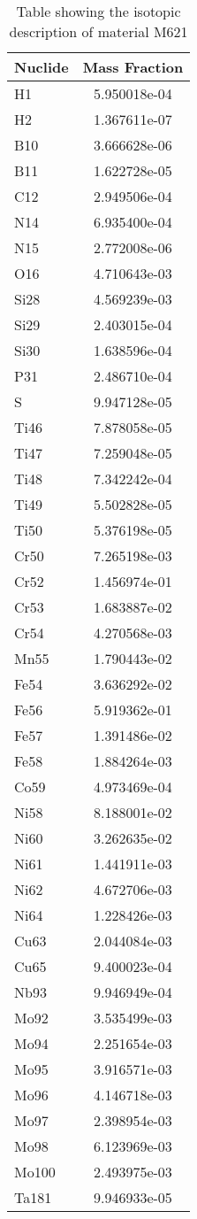 \begin{centering}
\begin{table}[ht!]
\begin{tabular}{l | c}
\hline
Nuclide & Mass Fraction\\
\hline
H1 & 5.950018e-04\\
H2 & 1.367611e-07\\
B10 & 3.666628e-06\\
B11 & 1.622728e-05\\
C12 & 2.949506e-04\\
N14 & 6.935400e-04\\
N15 & 2.772008e-06\\
O16 & 4.710643e-03\\
Si28 & 4.569239e-03\\
Si29 & 2.403015e-04\\
Si30 & 1.638596e-04\\
P31 & 2.486710e-04\\
S & 9.947128e-05\\
Ti46 & 7.878058e-05\\
Ti47 & 7.259048e-05\\
Ti48 & 7.342242e-04\\
Ti49 & 5.502828e-05\\
Ti50 & 5.376198e-05\\
Cr50 & 7.265198e-03\\
Cr52 & 1.456974e-01\\
Cr53 & 1.683887e-02\\
Cr54 & 4.270568e-03\\
Mn55 & 1.790443e-02\\
Fe54 & 3.636292e-02\\
Fe56 & 5.919362e-01\\
Fe57 & 1.391486e-02\\
Fe58 & 1.884264e-03\\
Co59 & 4.973469e-04\\
Ni58 & 8.188001e-02\\
Ni60 & 3.262635e-02\\
Ni61 & 1.441911e-03\\
Ni62 & 4.672706e-03\\
Ni64 & 1.228426e-03\\
Cu63 & 2.044084e-03\\
Cu65 & 9.400023e-04\\
Nb93 & 9.946949e-04\\
Mo92 & 3.535499e-03\\
Mo94 & 2.251654e-03\\
Mo95 & 3.916571e-03\\
Mo96 & 4.146718e-03\\
Mo97 & 2.398954e-03\\
Mo98 & 6.123969e-03\\
Mo100 & 2.493975e-03\\
Ta181 & 9.946933e-05
\end{tabular}
\caption{Table showing the isotopic description of material M621}
\label{table:material_M621}
\end{table}\clearpage


\end{centering}
